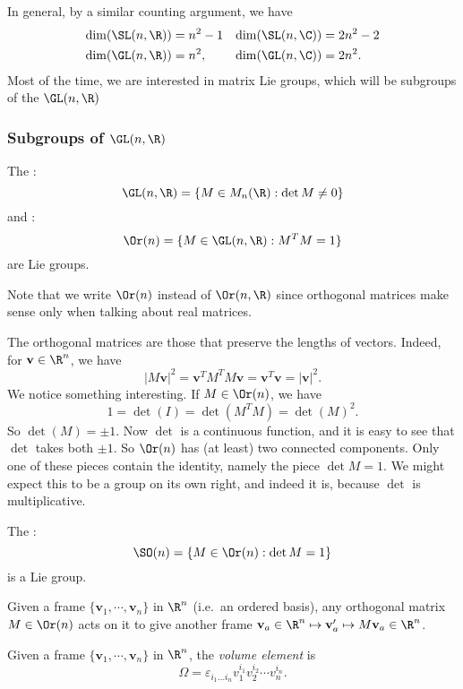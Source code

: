 \documentclass[a4paper]{article}
\begin{document}
In general, by a similar counting argument, we have
\begin{align*}
  \dim (\SL(n, \R)) &= n^2 - 1& \dim (\SL(n, \C)) &= 2n^2 - 2\\
  \dim (\GL(n, \R)) &= n^2,& \dim(\GL(n, \C)) &= 2n^2.
\end{align*}
Most of the time, we are interested in matrix Lie groups, which will be subgroups of the $\GL(n, \R)$

\subsubsection*{Subgroups of \texorpdfstring{$\GL(n, \R)$}{GL(n, R)}}
\begin{lemma}
  The :
  \[
    \GL(n, \R) = \{M \in M_n(\R): \det M \not= 0\}
  \]
  and :
  \[
    \Or(n) = \{M \in \GL(n, \R): M^TM = 1\}
  \]
  are Lie groups.
\end{lemma}
Note that we write $\Or(n)$ instead of $\Or(n, \R)$ since orthogonal matrices make sense only when talking about real matrices.

The orthogonal matrices are those that preserve the lengths of vectors. Indeed, for $\mathbf{v}\in \R^n$, we have
\[
  |M\mathbf{v}|^2 = \mathbf{v}^T M^T M \mathbf{v} = \mathbf{v}^T \mathbf{v} = |\mathbf{v}|^2.
\]
We notice something interesting. If $M \in \Or(n)$, we have
\[
  1 = \det(I) = \det(M^TM) = \det(M)^2.
\]
So $\det(M) = \pm 1$. Now $\det$ is a continuous function, and it is easy to see that $\det$ takes both $\pm 1$. So $\Or(n)$ has (at least) two connected components. Only one of these pieces contain the identity, namely the piece $\det M = 1$. We might expect this to be a group on its own right, and indeed it is, because $\det$ is multiplicative.
\begin{lemma}
  The  :
  \[
    \SO(n) = \{M \in \Or(n): \det M = 1\}
  \]
  is a Lie group.
\end{lemma}

Given a frame $\{\mathbf{v}_1, \cdots, \mathbf{v}_n\}$ in $\R^n$ (i.e.\ an ordered basis), any orthogonal matrix $M \in \Or(n)$ acts on it to give another frame $\mathbf{v}_a \in \R^n \mapsto \mathbf{v}_a' \mapsto M\mathbf{v}_a \in \R^n$.
\begin{defi}
  Given a frame $\{\mathbf{v}_1, \cdots, \mathbf{v}_n\}$ in $\R^n$, the \emph{volume element} is
  \[
    \Omega = \varepsilon_{i_1 \ldots i_n} v_1^{i_1} v_2^{i_2} \cdots v_n^{i_n}.
  \]
\end{defi}
\end{document}
